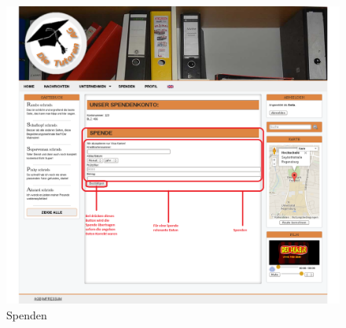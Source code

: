 \begin{figure}[!htbp]
 \centering
 \includegraphics[width=1\textwidth]{../Screenshots/de/Spenden_logged_in}
 \caption{Spenden}
 \label{fig:DonationDe}
\end{figure}